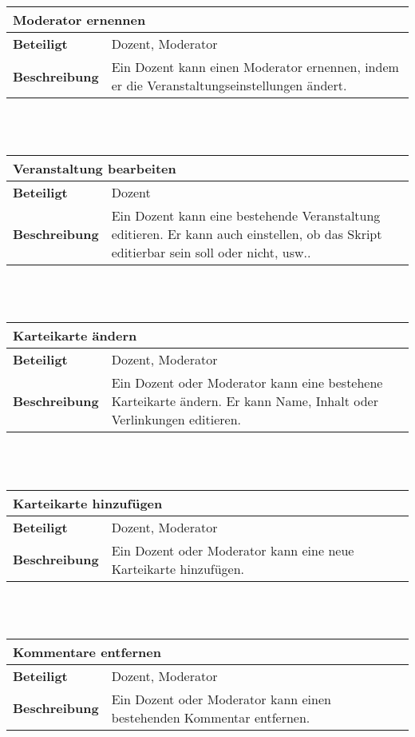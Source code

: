 \documentclass[12pt,a4paper]{article}
\begin{document}
\begin{tabular}{l p{10cm}}
\multicolumn{2}{l}{\textbf{Moderator ernennen}} \\ \hline
\textbf{Beteiligt} & Dozent, Moderator \\ \hline 
\textbf{Beschreibung} & Ein Dozent kann einen Moderator ernennen, indem er die Veranstaltungseinstellungen ändert.\\ 
\hline 
\end{tabular}\\\\

\begin{tabular}{l p{10cm}}
\multicolumn{2}{l}{\textbf{Veranstaltung bearbeiten}} \\ \hline
\textbf{Beteiligt} & Dozent \\ \hline 
\textbf{Beschreibung} & Ein Dozent kann eine bestehende Veranstaltung editieren. Er kann auch einstellen, ob das Skript editierbar sein soll oder nicht, usw..\\ 
\hline 
\end{tabular}\\\\

\begin{tabular}{l p{10cm}}
\multicolumn{2}{l}{\textbf{Karteikarte ändern}} \\ \hline
\textbf{Beteiligt} & Dozent, Moderator \\ \hline 
\textbf{Beschreibung} & Ein Dozent oder Moderator kann eine bestehene Karteikarte ändern. Er kann Name, Inhalt oder Verlinkungen editieren.\\ 
\hline 
\end{tabular}\\\\

\begin{tabular}{l p{10cm}}
\multicolumn{2}{l}{\textbf{Karteikarte hinzufügen}} \\ \hline
\textbf{Beteiligt} & Dozent, Moderator \\ \hline 
\textbf{Beschreibung} & Ein Dozent oder Moderator kann eine neue Karteikarte hinzufügen.\\ 
\hline 
\end{tabular}\\\\

\begin{tabular}{l p{10cm}}
\multicolumn{2}{l}{\textbf{Kommentare entfernen}} \\ \hline
\textbf{Beteiligt} & Dozent, Moderator \\ \hline 
\textbf{Beschreibung} & Ein Dozent oder Moderator kann einen bestehenden Kommentar entfernen.\\ 
\hline 
\end{tabular}\\\\
\end{document}
